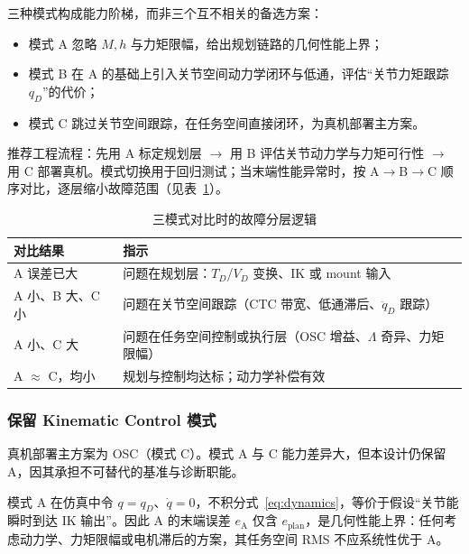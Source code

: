\documentclass[UTF8, a4paper, 12pt]{ctexart}
\begin{document}
三种模式构成能力阶梯，而非三个互不相关的备选方案：
\begin{itemize}[leftmargin=2em]
    \item 模式 A 忽略 $M,h$ 与力矩限幅，给出规划链路的几何性能上界；
    \item 模式 B 在 A 的基础上引入关节空间动力学闭环与低通，评估``关节力矩跟踪 $q_D$''的代价；
    \item 模式 C 跳过关节空间跟踪，在任务空间直接闭环，为真机部署主方案。
\end{itemize}

推荐工程流程：先用 A 标定规划层 $\rightarrow$ 用 B 评估关节动力学与力矩可行性 $\rightarrow$ 用 C 部署真机。模式切换用于回归测试；当末端性能异常时，按 A$\rightarrow$B$\rightarrow$C 顺序对比，逐层缩小故障范围（见表~\ref{tab:fault-isolation}）。

\begin{table}[H]
  \centering
  \caption{三模式对比时的故障分层逻辑}
  \label{tab:fault-isolation}
  \renewcommand{\arraystretch}{1.2}
  \begin{tabular}{@{} p{3.5cm} p{9.5cm} @{}}
    \toprule
    对比结果 & 指示 \\
    \midrule
    A 误差已大 & 问题在规划层：$T_D$/$V_D$ 变换、IK 或 mount 输入 \\
    A 小、B 大、C 小 & 问题在关节空间跟踪（CTC 带宽、低通滞后、$\ddot{q}_D$ 跟踪） \\
    A 小、C 大 & 问题在任务空间控制或执行层（OSC 增益、$\Lambda$ 奇异、力矩限幅） \\
    A $\approx$ C，均小 & 规划与控制均达标；动力学补偿有效 \\
    \bottomrule
  \end{tabular}
\end{table}

\subsubsection{保留 Kinematic Control 模式}
\label{sec:mode-a-rationale}

真机部署主方案为 OSC（模式 C）。模式 A 与 C 能力差异大，但本设计仍保留 A，因其承担不可替代的基准与诊断职能。

模式 A 在仿真中令 $q=q_D$、$\dot{q}=0$，不积分式~\eqref{eq:dynamics}，等价于假设``关节能瞬时到达 IK 输出''。因此 A 的末端误差 $e_{\mathrm{A}}$ 仅含 $e_{\mathrm{plan}}$，是几何性能上界：任何考虑动力学、力矩限幅或电机滞后的方案，其任务空间 RMS 不应系统性优于 A。
\end{document}
